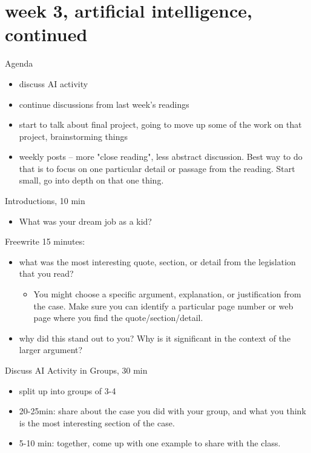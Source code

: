 \documentclass[11pt]{article}
\author{fcalado}
\date{\today}
\title{}
\begin{document}
\tableofcontents

\section{week 3, artificial intelligence, continued}
\label{sec:org3e29e76}
Agenda
\begin{itemize}
\item discuss AI activity
\item continue discussions from last week's readings
\item start to talk about final project, going to move up some of the work
on that project, brainstorming things
\item weekly posts -- more "close reading", less abstract discussion. Best
way to do that is to focus on one particular detail or passage from
the reading. Start small, go into depth on that one thing.
\end{itemize}

Introductions, 10 min
\begin{itemize}
\item What was your dream job as a kid?
\end{itemize}

Freewrite 15 minutes:
\begin{itemize}
\item what was the most interesting quote, section, or detail from the
legislation that you read?
\begin{itemize}
\item You might choose a specific argument, explanation, or
justification from the case. Make sure you can identify a
particular page number or web page where you find the
quote/section/detail.
\end{itemize}
\item why did this stand out to you? Why is it significant in the context
of the larger argument?
\end{itemize}

Discuss AI Activity in Groups, 30 min
\begin{itemize}
\item split up into groups of 3-4
\item 20-25min: share about the case you did with your group, and what you
think is the most interesting section of the case.

\item 5-10 min: together, come up with one example to share with the
class.
\end{itemize}
\end{document}
